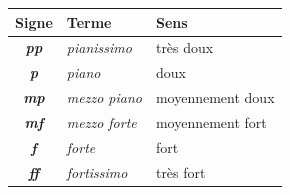 \begin{tabular}{@{}c l l@{}}
\toprule
\textbf{Signe} & \textbf{Terme} & \textbf{Sens} \\
\midrule
\textbf{\emph{pp}} & \emph{pianissimo} & très doux \\
\textbf{\emph{p}} & \emph{piano} & doux \\
\textbf{\emph{mp}} & \emph{mezzo piano} & moyennement doux \\
\textbf{\emph{mf}} & \emph{mezzo forte} & moyennement fort \\
\textbf{\emph{f}} & \emph{forte} & fort \\
\textbf{\emph{ff}} & \emph{fortissimo} & très fort \\
\bottomrule
\end{tabular}
